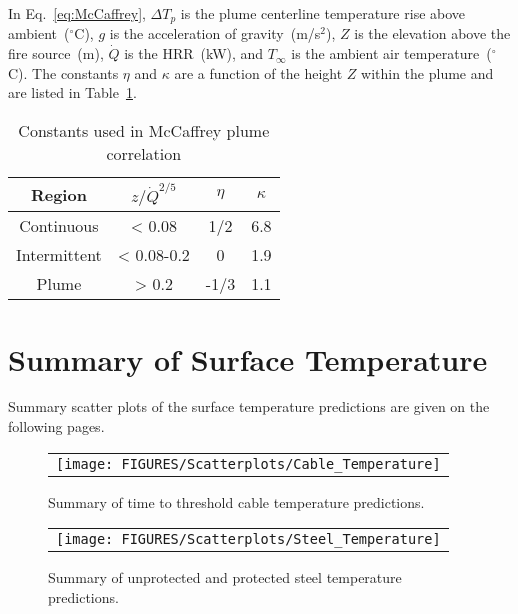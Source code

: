 In Eq.~\ref{eq:McCaffrey}, $\Delta T_p$ is the plume centerline temperature rise above ambient~($^\circ$C), $g$ is the acceleration of gravity~(m/s$^2$), $Z$ is the elevation above the fire source~(m), $\dot Q$ is the HRR~(kW), and $T_\infty$ is the ambient air temperature~($^\circ$C). The constants $\eta$ and $\kappa$ are a function of the height $Z$ within the plume and are listed in Table~\ref{tbl:McCaffrey_constants}.

\vspace{\baselineskip}
\begin{table}[ht]
\begin{center}
\caption{Constants used in McCaffrey plume correlation}
\label{tbl:McCaffrey_constants}
\begin{tabular}{|c|c|c|c|}
\hline
Region & $z/\dot Q^{2/5}$      & $\eta$ & $\kappa$ \\
\hline
Continuous & < 0.08       & 1/2  & 6.8 \\
Intermittent & < 0.08-0.2 & 0     & 1.9 \\
Plume         & > 0.2         & -1/3 & 1.1 \\
\hline
\end{tabular}
\end{center}
\end{table}

\clearpage

\section{Summary of Surface Temperature}

Summary scatter plots of the surface temperature predictions are given on the following pages.

\begin{figure}[ht]
\begin{center}
\begin{tabular}{l}
\texttt{[image: FIGURES/Scatterplots/Cable\_Temperature]}
\end{tabular}
\end{center}
\caption[Summary of time to threshold cable temperature predictions.]
{Summary of time to threshold cable temperature predictions.}
\label{Surface_Temperature_THIEF_Summary}
\end{figure}

\begin{figure}[p]
\begin{center}
\begin{tabular}{l}
\texttt{[image: FIGURES/Scatterplots/Steel\_Temperature]}
\end{tabular}
\end{center}
\caption[Summary of steel temperature predictions.]
{Summary of unprotected and protected steel temperature predictions.}
\label{Surface_Temperature_Steel_Summary}
\end{figure}

